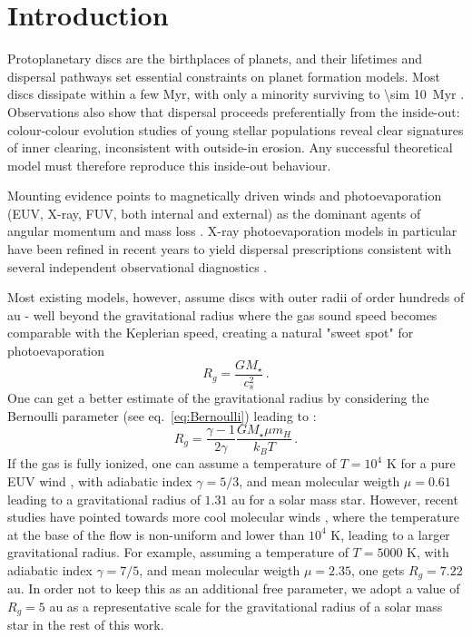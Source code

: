 \documentclass[fleqn,usenatbib]{mnras}
\begin{document}

\section{Introduction}\label{sec:introduction}

 Protoplanetary discs are the birthplaces of planets, and their lifetimes and dispersal pathways set essential constraints on planet formation models. Most discs dissipate within a few Myr, with only a minority surviving to \SI{\sim 10}{Myr} \citep{2001ApJ...553L.153H, 2010A&A...510A..72F, 2020ApJ...890..106S, 2022ApJ...939L..10P}. Observations also show that dispersal proceeds preferentially from the inside-out: colour-colour evolution studies of young stellar populations \citep{2011MNRAS.410..671E, 2013MNRAS.428.3327K, 2015MNRAS.452.3689E} reveal clear signatures of inner clearing, inconsistent with outside-in erosion. Any successful theoretical model must therefore reproduce this inside-out behaviour.

 Mounting evidence points to magnetically driven winds and photoevaporation (EUV, X-ray, FUV, both internal and external) as the dominant agents of angular momentum and mass loss \citep{2017RSOS....470114E, 2023ASPC..534..465L, 2023ASPC..534..567P}. X-ray photoevaporation models in particular have been refined in recent years to yield dispersal prescriptions consistent with several independent observational diagnostics \citep{2016MNRAS.460.3472E, 2020MNRAS.496..223W, 2021A&A...648A.121F, 2023ApJ...955L..11R, 2023MNRAS.526L.105E}.

 Most existing models, however, assume discs with outer radii of order hundreds of au - well beyond the gravitational radius where the gas sound speed becomes comparable with the Keplerian speed, creating a natural "sweet spot" for photoevaporation \citep{1994ApJ...428..654H}
 \begin{equation}
    R_g = \frac{GM_\star}{c_s^2}\,.
 \end{equation} 
 One can get a better estimate of the gravitational radius by considering the Bernoulli parameter (see eq.~\ref{eq:Bernoulli}) leading to \citep[for a full derivation see][]{2003PASA...20..337L}:
 \begin{equation}
   R_g = \frac{\gamma-1}{2\gamma} \frac{GM_\star \mu m_H}{k_B T}\,.
 \end{equation}
 If the gas is fully ionized, one can assume a temperature of $T = 10^4$ K for a pure EUV wind \citep{2012MNRAS.422.1880O}, with adiabatic index $\gamma=5/3$, and mean molecular weigth $\mu = 0.61$ leading to a gravitational radius of $1.31$ au for a solar mass star. However, recent studies have pointed towards more cool molecular winds \citep[see e.g.][]{2024A&A...690A.296S}, where the temperature at the base of the flow is non-uniform and lower than $10^4$ K, leading to a larger gravitational radius. For example, assuming a temperature of $T = 5000$ K, with adiabatic index $\gamma=7/5$, and mean molecular weigth $\mu = 2.35$, one gets $R_g = 7.22$ au. In order not to keep this as an additional free parameter, we adopt a value of $R_g = 5$ au as a representative scale for the gravitational radius of a solar mass star in the rest of this work.
 
\end{document}
